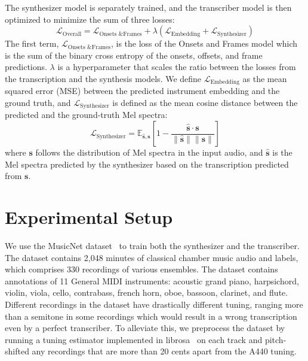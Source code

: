 The synthesizer model is separately trained, and the transcriber model is then optimized to minimize the sum of three losses:
\begin{equation}\label{eqn:overall-loss}
\mathcal{L}_{\text{Overall}} = \mathcal{L}_{\text{Onsets \& Frames}} + \lambda \left ( \mathcal{L}_{\text{Embedding}} + \mathcal{L}_{\text{Synthesizer}} \right )
\end{equation}
The first term, $\mathcal{L}_{\text{Onsets \& Frames}}$, is the loss of the Onsets and Frames model which is the sum of the binary cross entropy of the onsets, offsets, and frame predictions.
$\lambda$ is a hyperparameter that scales the ratio between the losses from the transcription and the synthesis models.
We define $\mathcal{L}_{\text{Embedding}}$ as the mean squared error (MSE) between the predicted instrument embedding and the ground truth, and $\mathcal{L}_{\text{Synthesizer}}$ is defined as the mean cosine distance between the predicted and the ground-truth Mel spectra:
\begin{equation}\label{eqn:cosine-distance-loss}
\mathcal{L}_{\text{Synthesizer}} = \mathbb{E}_{\hat{\mathbf{s}}, \mathbf{s}} \left [ 1 - \frac{ \hat{\mathbf{s}} \cdot \mathbf{s} }{\lVert \hat{\mathbf{s}} \rVert \lVert \mathbf{s} \rVert} \right ]
\end{equation}
where $\mathbf{s}$ follows the distribution of Mel spectra in the input audio, and $\hat{\mathbf{s}}$ is the Mel spectra predicted by the synthesizer based on the transcription predicted from $\mathbf{s}$.

\section{Experimental Setup}

We use the MusicNet dataset~\cite{thickstun2017musicnet} to train both the synthesizer and the transcriber.
The dataset contains 2,048 minutes of classical chamber music audio and labels, which comprises 330 recordings of various ensembles.
The dataset contains annotations of 11 General MIDI instruments: acoustic grand piano, harpsichord, violin, viola, cello, contrabass, french horn, oboe, bassoon, clarinet, and flute.
Different recordings in the dataset have drastically different tuning, ranging more than a semitone in some recordings which would result in a wrong transcription even by a perfect transcriber.
To alleviate this, we preprocess the dataset by running a tuning estimator implemented in librosa~\cite{mcfee2015librosa} on each track and pitch-shifted any recordings that are more than 20 cents apart from the A440 tuning.

